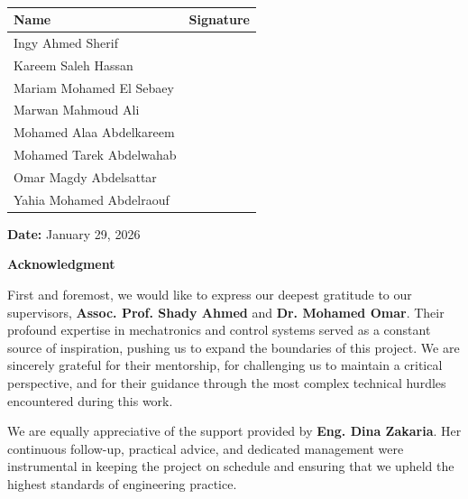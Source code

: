 \documentclass[11pt,a4paper,twoside]{report}
\begin{document}
\begin{table}[H]
\centering
\renewcommand{\arraystretch}{2.5}  %
\begin{tabularx}{\textwidth}{|>{\centering\arraybackslash}X|>{\centering\arraybackslash}X|}  
\hline
\textbf{Name} & \textbf{Signature} \\ \hline
Ingy Ahmed Sherif &  \\ \hline
Kareem Saleh Hassan &  \\ \hline
Mariam Mohamed El Sebaey &  \\ \hline
Marwan Mahmoud Ali &  \\ \hline
Mohamed Alaa Abdelkareem &  \\ \hline
Mohamed Tarek Abdelwahab &  \\ \hline
Omar Magdy Abdelsattar &  \\ \hline
Yahia Mohamed Abdelraouf &  \\ \hline
\end{tabularx}
\caption*{} %
\label{tab:signatures}
\end{table}

\textbf{Date:}
January 29, 2026
\clearpage

\vspace*{-2cm} %
\thispagestyle{plain}
\begin{center}
    {\Large \textbf{Acknowledgment}} %
\end{center}

\vspace{1cm} %

First and foremost, we would like to express our deepest gratitude to our supervisors, \textbf{Assoc. Prof. Shady Ahmed} and \textbf{Dr. Mohamed Omar}. Their profound expertise in mechatronics and control systems served as a constant source of inspiration, pushing us to expand the boundaries of this project. We are sincerely grateful for their mentorship, for challenging us to maintain a critical perspective, and for their guidance through the most complex technical hurdles encountered during this work.

We are equally appreciative of the support provided by \textbf{Eng. Dina Zakaria}. Her continuous follow-up, practical advice, and dedicated management were instrumental in keeping the project on schedule and ensuring that we upheld the highest standards of engineering practice.
\end{document}
